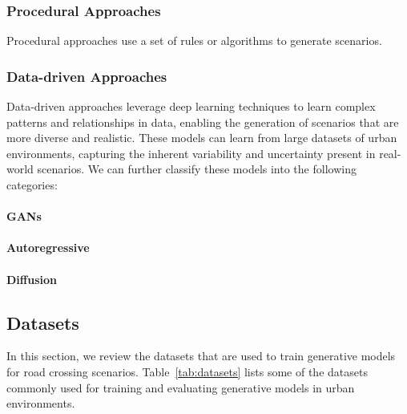 \documentclass{article}
\begin{document}
\subsubsection{Procedural Approaches}

Procedural approaches use a set of rules or algorithms to generate scenarios.

\subsubsection{Data-driven Approaches}

Data-driven  approaches leverage deep learning techniques to learn complex patterns and relationships in data, enabling the generation of scenarios that are more diverse and realistic. These models can learn from large datasets of urban environments, capturing the inherent variability and uncertainty present in real-world scenarios. We can further classify these models into the following categories:

\paragraph{GANs} 

\paragraph{Autoregressive} 

\paragraph{Diffusion} 


\subsection{Datasets}

In this section, we review the datasets that are used to train generative models for road crossing scenarios. Table~\ref{tab:datasets} lists some of the datasets commonly used for training and evaluating generative models in urban environments.
\end{document}
